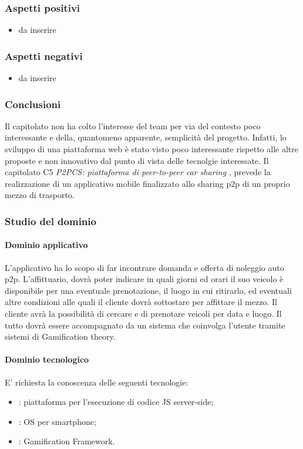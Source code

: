 		\subsubsection{Aspetti positivi}
		\begin{itemize}
			\item da inserire
		\end{itemize}
		\subsubsection{Aspetti negativi}
		\begin{itemize}
			\item da inserire
		\end{itemize}
		\subsubsection{Conclusioni}
		Il capitolato non ha colto l'interesse del team per via del contesto poco interessante e della, quantomeno apparente, semplicità del progetto. Infatti, lo sviluppo di una piattaforma web è stato visto poco interessante rispetto alle altre proposte e non innovativo dal punto di vista delle tecnolgie interessate. 
		Il capitolato C5 \emph{P2PCS:  piattaforma di peer-to-peer car sharing} , prevede la realizzazione di un
applicativo mobile finalizzato allo sharing p2p di un proprio mezzo di trasporto.

		\subsubsection{Studio del dominio}
			\paragraph{Dominio applicativo} \Spazio
			L'applicativo ha lo scopo di far incontrare domanda e offerta di noleggio auto p2p.
L'affittuario, dovrà poter indicare in quali giorni ed orari il suo veicolo è disponibile
per una eventuale prenotazione, il luogo in cui ritirarlo, ed eventuali altre
condizioni alle quali il cliente dovrà sottostare per affittare il mezzo.
Il cliente avrà la possibilità di cercare e di prenotare veicoli per data e luogo.
Il tutto dovrà essere accompagnato da un sistema che coinvolga l'utente tramite sistemi di
Gamification theory.
			\paragraph{Dominio tecnologico} \Spazio
			E' richiesta la conoscenza delle seguenti tecnologie:
				\begin{itemize}
					\item \textbf{}: piattaforma per l'esecuzione di codice JS server-side;
					\item \textbf{}: OS per smartphone;
					\item \textbf{}: Gamification Framework.
				\end{itemize}
